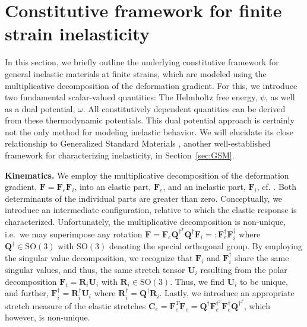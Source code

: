 \section{Constitutive framework for finite strain inelasticity}
\label{sec:constitutive}
%
In this section, we briefly outline the underlying constitutive framework for general inelastic materials at finite strains, which are modeled using the multiplicative decomposition of the deformation gradient.
For this, we introduce two fundamental scalar-valued quantities: 
The Helmholtz free energy, $\psi$, as well as a dual potential, $\omega$.
All constitutively dependent quantities can be derived from these thermodynamic potentials.
This dual potential approach is certainly not the only method for modeling inelastic behavior. We will elucidate its close relationship to Generalized Standard Materials \cite{halphen1975}, another well-established framework for characterizing inelasticity, in Section~\ref{sec:GSM}.\newline

\textbf{Kinematics.} We employ the multiplicative decomposition of the deformation gradient, $\bm{F}=\bm{F}_e\bm{F}_i$, into an elastic part, $\bm{F}_e$, and an inelastic part, $\bm{F}_i$, cf. \cite{Eckart1948,Kroener1959,sidoroff1974,rodriguez1994}.
Both determinants of the individual parts are greater than zero.
Conceptually, we introduce an intermediate configuration, relative to which the elastic response is characterized.
Unfortunately, the multiplicative decomposition is non-unique, i.e.\ we may superimpose any rotation $\bm{F}=\bm{F}_e\bm{Q}^{\dagger^T}\bm{Q}^\dagger\bm{F}_i=:\bm{F}_e^\dagger\bm{F}_i^\dagger$ where $\bm{Q}^\dagger \in \mathrm{SO}(3)$ with $\mathrm{SO}(3)$ denoting the special orthogonal group.
By employing the singular value decomposition, we recognize that $\bm{F}_i$ and $\bm{F}_i^\dagger$ share the same singular values, and thus, the same stretch tensor $\bm{U}_i$ resulting from the polar decomposition $\bm{F}_i=\bm{R}_i\bm{U}_i$ with $\bm{R}_i \in \mathrm{SO}(3)$.
Thus, we find $\bm{U}_i$ to be unique, and further, $\bm{F}_i^\dagger=\bm{R}_i^\dagger\bm{U}_i$ where $\bm{R}_i^\dagger=\bm{Q}^\dagger\bm{R}_i$.
Lastly, we introduce an appropriate stretch measure of the elastic stretches $\bm{C}_e = \bm{F}_e^T\bm{F}_e = \bm{Q}^\dagger\bm{F}_e^{\dagger^T}\bm{F}_e^\dagger\bm{Q}^{\dagger^T}$, which however, is non-unique.\newline

